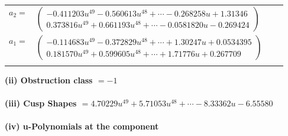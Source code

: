 \documentclass[1p]{elsarticle_modified}
\theoremstyle{definition}
\begin{document}
\begin{tabular}{m{7pt} m{180pt} m{7pt} m{180pt} }
\flushright $a_{2}=$&$\begin{pmatrix}-0.411203 u^{49}-0.560613 u^{48}+\cdots-0.268258 u+1.31346\\0.373816 u^{49}+0.661193 u^{48}+\cdots-0.0581820 u-0.269424\end{pmatrix}$ \\
\flushright $a_{1}=$&$\begin{pmatrix}-0.114683 u^{49}-0.372829 u^{48}+\cdots+1.30247 u+0.0534395\\0.181570 u^{49}+0.599605 u^{48}+\cdots+1.71776 u+0.267709\end{pmatrix}$\\&\end{tabular}
\flushleft \textbf{(ii) Obstruction class $= -1$}\\~\\
\flushleft \textbf{(iii) Cusp Shapes $= 4.70229 u^{49}+5.71053 u^{48}+\cdots-8.33362 u-6.55580$}\\~\\
\newpage\renewcommand{\arraystretch}{1}
\flushleft \textbf{(iv) u-Polynomials at the component}\newline \\
\end{document}

